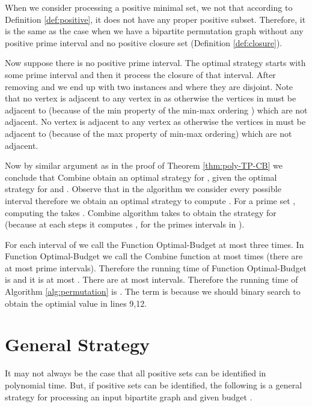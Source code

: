 \documentclass[letterpaper,11pt,abstracton]{scrartcl}
\newcommand{\qed}{\hfill}
\begin{document}
When we consider processing a positive minimal set,  we not that according to Definition \ref{def:positive},
it does not have any proper positive subset. Therefore, it is the same as the case when we have
a bipartite permutation graph without any positive prime interval and no positive closure set
(Definition \ref{def:closure}).

Now suppose there is no positive prime interval. The optimal strategy starts with some prime interval  
and then it process the closure of that interval. After removing  and 
we end up with two instances  and  where they are disjoint.
Note that no vertex  is adjacent to any vertex in  as otherwise the vertices in  must be adjacent to 
 (because of the min property of the min-max ordering ) which are not adjacent. No vertex  is adjacent to any vertex  as otherwise
the vertices in  must be adjacent to  (because of the max property of min-max ordering) which are not adjacent. 

Now by similar argument as in the proof of Theorem \ref{thm:poly-TP-CB} we conclude that Combine
obtain an optimal strategy for , given the optimal strategy for  and .
Observe that in the algorithm we consider every possible interval  therefore we obtain an optimal strategy to compute .
For a prime set , computing the  takes . Combine algorithm takes  to obtain the strategy
for  (because at each steps it computes ,  for the primes intervals in ).




For each interval  of  we call the Function Optimal-Budget at most three times. 
In Function Optimal-Budget we call the Combine function at most  times (there are at most  prime intervals). Therefore the running time of
Function Optimal-Budget is  and it is at most . There are at most  intervals. 
Therefore the running time of Algorithm \ref{alg:permutation} is . The term  is because we should binary search to obtain the optimial value  
in lines 9,12. 



\qed



\section{General Strategy}\label{sec:general-strategy}
It may not always be the case that all positive sets can be identified
in polynomial time. But, if positive sets can be identified, the
following is a general strategy for processing an input bipartite graph 
and given budget .
\end{document}

